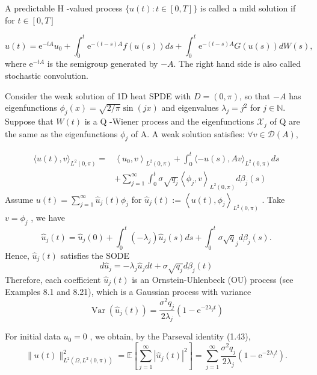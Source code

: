 \begin{definition}
A predictable  H -valued process  $\{u(t): t \in[0, T]\}$  is called a mild solution if for  $t \in[0, T] $

$$u(t)=\mathrm{e}^{-t A} u_{0}+\int_{0}^{t} \mathrm{e}^{-(t-s) A} f(u(s)) d s+\int_{0}^{t} \mathrm{e}^{-(t-s) A} G(u(s)) d W(s),$$
where  $\mathrm{e}^{-t A}$  is the semigroup generated by  $-A$. The right hand side is also called stochastic convolution.
\end{definition}

\begin{example}
    Consider the weak solution of 1D heat SPDE with  $D=(0, \pi)$, so that  $-A$  has eigenfunctions  $\phi_{j}(x)=\sqrt{2 / \pi} \sin (j x)$ 
    and eigenvalues  $\lambda_{j}=j^{2}$  for  $j \in \mathbb{N}$. Suppose that  $W(t)$  is a  Q -Wiener process 
    and the eigenfunctions  $\mathcal{X}_{j}$ of Q are the same as the eigenfunctions  $\phi_{j}$  of  A. A weak solution satisfies: $\forall v \in \mathcal{D}(A)$, 

\begin{equation}
    \begin{aligned}
    \langle u(t), v\rangle_{L^{2}(0, \pi)}= & \left\langle u_{0}, v\right\rangle_{L^{2}(0, \pi)}+\int_{0}^{t}\langle-u(s), A v\rangle_{L^{2}(0, \pi)} d s \\
    & +\sum_{j=1}^{\infty} \int_{0}^{t} \sigma \sqrt{q_{j}}\left\langle\phi_{j}, v\right\rangle_{L^{2}(0, \pi)} d \beta_{j}(s)
    \end{aligned}
\end{equation}
Assume $u(t)=\sum_{j=1}^{\infty} \hat{u}_{j}(t) \phi_{j}$  for  $\hat{u}_{j}(t):=\left\langle u(t), \phi_{j}\right\rangle_{L^{2}(0, \pi)}$ . Take  $v=\phi_{j}$ , we have 
\begin{equation}
    \hat{u}_{j}(t)=\hat{u}_{j}(0)+\int_{0}^{t}\left(-\lambda_{j}\right) \hat{u}_{j}(s) d s+\int_{0}^{t} \sigma \sqrt{q}_{j} d \beta_{j}(s) .
\end{equation}
Hence,  $\hat{u}_{j}(t)$  satisfies the SODE
\begin{equation}
d \hat{u}_{j}=-\lambda_{j} \hat{u}_{j} d t+\sigma \sqrt{q_{j}} d \beta_{j}(t)
\end{equation}
Therefore, each coefficient  $\hat{u}_{j}(t)$  is an Ornstein-Uhlenbeck (OU) process (see Examples 8.1 and 8.21), which is a Gaussian process with variance
\begin{equation}
\operatorname{Var}\left(\hat{u}_{j}(t)\right)=\frac{\sigma^{2} q_{j}}{2 \lambda_{j}}\left(1-\mathrm{e}^{-2 \lambda_{j} t}\right)
\end{equation}

For initial data  $u_{0}=0$ , we obtain, by the Parseval identity (1.43),
\begin{equation}
\|u(t)\|_{L^{2}\left(\Omega, L^{2}(0, \pi)\right)}^{2}=\mathbb{E}\left[\sum_{j=1}^{\infty}\left|\hat{u}_{j}(t)\right|^{2}\right]=\sum_{j=1}^{\infty} \frac{\sigma^{2} q_{j}}{2 \lambda_{j}}\left(1-\mathrm{e}^{-2 \lambda_{j} t}\right) .
\end{equation}
\end{example}
